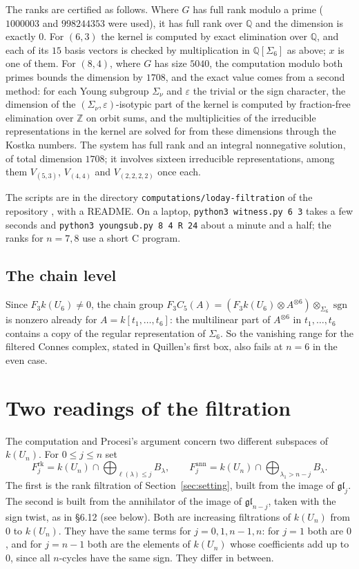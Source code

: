\documentclass[11pt,a4paper]{amsart}
\theoremstyle{definition}
\theoremstyle{remark}
\newcommand{\gl}{\mathfrak{gl}}
\newcommand{\Q}{\mathbb Q}
\newcommand{\sgn}{\operatorname{sgn}}
\begin{document}
The ranks are certified as follows. Where $G$ has full rank modulo a prime ($1000003$ and $998244353$ were used), it has full rank over $\Q$ and the dimension is exactly $0$. For $(6, 3)$ the kernel is computed by exact elimination over $\Q$, and each of its $15$ basis vectors is checked by multiplication in $\Q[\Sigma_6]$ as above; $x$ is one of them. For $(8, 4)$, where $G$ has size $5040$, the computation modulo both primes bounds the dimension by $1708$, and the exact value comes from a second method: for each Young subgroup $\Sigma_\nu$ and $\varepsilon$ the trivial or the sign character, the dimension of the $(\Sigma_\nu, \varepsilon)$-isotypic part of the kernel is computed by fraction-free elimination over $\mathbb Z$ on orbit sums, and the multiplicities of the irreducible representations in the kernel are solved for from these dimensions through the Kostka numbers. The system has full rank and an integral nonnegative solution, of total dimension $1708$; it involves sixteen irreducible representations, among them $V_{(5,3)}$, $V_{(4,4)}$ and $V_{(2,2,2,2)}$ once each.

The scripts are in the directory \texttt{computations/loday-filtration} of the repository \cite{repo}, with a README. On a laptop, \texttt{python3 witness.py 6 3} takes a few seconds and \texttt{python3 youngsub.py 8 4 R 24} about a minute and a half; the ranks for $n = 7, 8$ use a short C program.

\subsection*{The chain level}
Since $F_3 k(U_6) \ne 0$, the chain group $F_3 C_5(A) = (F_3 k(U_6) \otimes A^{\otimes 6}) \otimes_{\Sigma_6} \sgn$ is nonzero already for $A = k[t_1, \dots, t_6]$: the multilinear part of $A^{\otimes 6}$ in $t_1, \dots, t_6$ contains a copy of the regular representation of $\Sigma_6$. So the vanishing range for the filtered Connes complex, stated in Quillen's first box, also fails at $n = 6$ in the even case.

\section{Two readings of the filtration}\label{sec:readings}

The computation and Procesi's argument concern two different subspaces of $k(U_n)$. For $0 \le j \le n$ set
\[
F^{\mathrm{rk}}_j = k(U_n) \cap \bigoplus_{\ell(\lambda) \le j} B_\lambda, \qquad
F^{\mathrm{ann}}_j = k(U_n) \cap \bigoplus_{\lambda_1 > n-j} B_\lambda .
\]
The first is the rank filtration of Section~\ref{sec:setting}, built from the image of $\gl_j$. The second is built from the annihilator of the image of $\gl_{n-j}$, taken with the sign twist, as in \S6.12 (see below). Both are increasing filtrations of $k(U_n)$ from $0$ to $k(U_n)$. They have the same terms for $j = 0, 1, n-1, n$: for $j = 1$ both are $0$, and for $j = n-1$ both are the elements of $k(U_n)$ whose coefficients add up to $0$, since all $n$-cycles have the same sign. They differ in between.
\end{document}
